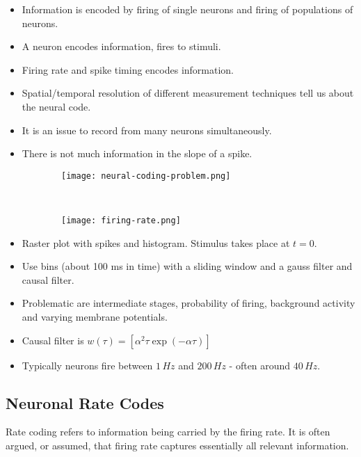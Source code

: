 \documentclass[main]{subfiles}
\begin{document}
\begin{itemize}[noitemsep,nolistsep]
	\item Information is encoded by firing of single neurons and firing of populations of neurons.
	\item A neuron encodes information, fires to stimuli.
	\item Firing rate and spike timing encodes information.
	\item Spatial/temporal resolution of different measurement techniques tell us about the neural code.
	\item It is an issue to record from many neurons simultaneously.
	\item There is not much information in the slope of a spike.
\end{itemize}

\begin{figure}[H]
	\centering
	\begin{subfigure}[b]{0.5\textwidth}
		\centering
		\texttt{[image: neural-coding-problem.png]}
	\end{subfigure}%
	~
	\begin{subfigure}[b]{0.5\textwidth}
		\centering
		\texttt{[image: firing-rate.png]}
	\end{subfigure}
\end{figure}

\begin{itemize}[noitemsep,nolistsep]
	\item Raster plot with spikes and histogram. Stimulus takes place at $t = 0$.
	\item Use bins (about 100 ms in time) with a sliding window and a gauss filter and causal filter.
	\item Problematic are intermediate stages, probability of firing, background activity and varying membrane potentials.
	\item Causal filter is $w(\tau) = [\alpha^2\tau\exp(-\alpha\tau)]$
	\item Typically neurons fire between $1\,Hz$ and $200\,Hz$ - often around $40\,Hz$.
\end{itemize}



\subsection{Neuronal Rate Codes}
Rate coding refers to information being carried by the firing rate. It is often
argued, or assumed, that firing rate captures essentially all relevant information.
\end{document}
